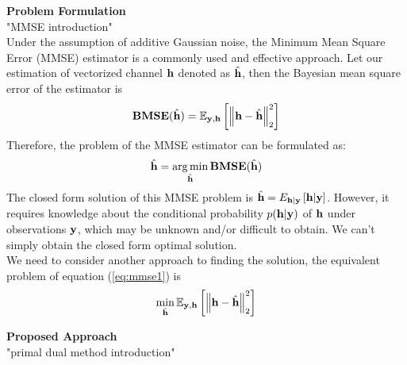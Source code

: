 \documentclass[a4paper, onecolumn, 11pt]{IEEEtran}
\begin{document}
    \noindent \textbf{Problem Formulation}\\
        "MMSE introduction"\\
        Under the assumption of additive Gaussian noise, the Minimum Mean Square Error (MMSE) estimator is a commonly used and effective approach.
        Let our estimation of vectorized channel ${\bf h}$ denoted as $\hat{{\bf h}}$, then the Bayesian mean square error of the estimator is 
        \begin{equation} \label{eq:bmse}
            {\bf B}{\bf M}{\bf S}{\bf E}(\hat{{\bf h}}) = \mathbb{E}_{{\bf y},{\bf h}}\left[\left\| {\bf h}-\hat{{\bf h}} \right\|^2_2\right]
        \end{equation}
        Therefore, the problem of the MMSE estimator can be formulated as:
        \begin{equation} \label{eq:mmse1}
            \hat{{\bf h}} = \operatorname*{arg\,min}_{\hat{{\bf h}}} {\bf B}{\bf M}{\bf S}{\bf E}(\hat{{\bf h}})
        \end{equation}
        The closed form solution of this MMSE problem is $\hat{{\bf h}} = E_{{\bf h}|{\bf y}}\left[{\bf h}|{\bf y}\right]$. However, it requires knowledge about the conditional probability
        $p({\bf h}|{\bf y})$ of ${\bf h}$ under observations ${\bf y}$, which may be unknown and/or difficult to obtain. We can't simply obtain the closed form optimal solution.\\
        We need to consider another approach to finding the solution, the equivalent problem of equation (\ref{eq:mmse1}) is
        \begin{equation} \label{eq:mmse2}
            \min_{\hat{{\bf h}}} \mathbb{E}_{{\bf y},{\bf h}}\left[\left\| {\bf h}-\hat{{\bf h}} \right\|^2_2\right]
        \end{equation}

    \noindent \textbf{Proposed Approach}\\
        "primal dual method introduction"
\end{document}
